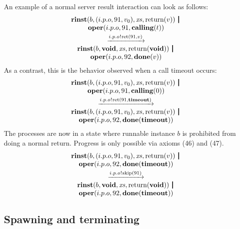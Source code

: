 \documentclass[twocolumn]{article}
\begin{document}
An example of a normal server result interaction can look as follows:
$$
\begin{array}{c}
	{\Trinst b {\Tclient {i.p.o} {91} {v_0}} \Xs {\Treturn v}} \,\Opar  \\
	{\Toper {i.p.o} {91} {\Tcalling t}} \vspace{0.6ex} \\
	\red{\say{i.p.o}{\Tret {91} v}} \\
	{\Trinst b \Tvoid \Xs {\Treturn \Tvoid}} \,\Opar \\
	{\Toper {i.p.o} {92} {\Tdone v}}
\end{array}
$$
As a contrast, this is the behavior observed when a call timeout occurs:
$$
\begin{array}{c}
	{\Trinst b {\Tclient {i.p.o} {91} {v_0}} \Xs {\Treturn v}} \,\Opar  \\
	{\Toper {i.p.o} {91} {\Tcalling 0}} \vspace{0.6ex} \\
	\red{\say{i.p.o}{\Tret {91} \Ttimeout}} \\
	{\Trinst b {\Tclient {i.p.o} {91} {v_0}} \Xs {\Treturn v}} \,\Opar  \\
	{\Toper {i.p.o} {92} {\Tdone \Ttimeout}}
\end{array}
$$
The processes are now in a state where runnable instance $b$ is prohibited from doing a normal return. Progress is only possible via axioms (46) and (47).
$$
\begin{array}{c}
	{\Trinst b {\Tclient {i.p.o} {91} {v_0}} \Xs {\Treturn v}} \,\Opar  \\
	{\Toper {i.p.o} {92} {\Tdone \Ttimeout}} \vspace{0.6ex} \\
	\red{\say{i.p.o}{\Tskip {91}}} \\
	{\Trinst b \Tvoid \Xs {\Treturn \Tvoid}} \,\Opar \\
	{\Toper {i.p.o} {92} {\Tdone \Ttimeout}}
\end{array}
$$


\subsection{Spawning and terminating} \label{sect:SpawnTerm}
\end{document}
